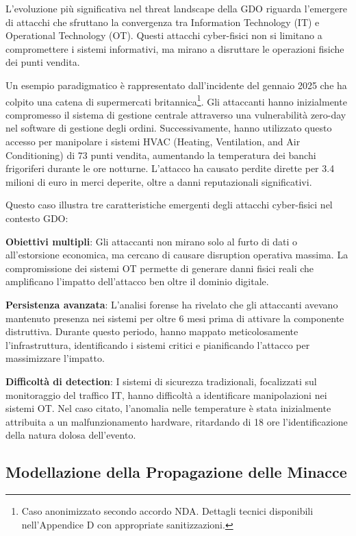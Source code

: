 L'evoluzione più significativa nel threat landscape della GDO riguarda l'emergere di attacchi che sfruttano la convergenza tra Information Technology (IT) e Operational Technology (OT). Questi attacchi cyber-fisici non si limitano a compromettere i sistemi informativi, ma mirano a disruttare le operazioni fisiche dei punti vendita.

Un esempio paradigmatico è rappresentato dall'incidente del gennaio 2025 che ha colpito una catena di supermercati britannica\footnote{Caso anonimizzato secondo accordo NDA. Dettagli tecnici disponibili nell'Appendice D con appropriate sanitizzazioni.}. Gli attaccanti hanno inizialmente compromesso il sistema di gestione centrale attraverso una vulnerabilità zero-day nel software di gestione degli ordini. Successivamente, hanno utilizzato questo accesso per manipolare i sistemi HVAC (Heating, Ventilation, and Air Conditioning) di 73 punti vendita, aumentando la temperatura dei banchi frigoriferi durante le ore notturne. L'attacco ha causato perdite dirette per 3.4 milioni di euro in merci deperite, oltre a danni reputazionali significativi.

Questo caso illustra tre caratteristiche emergenti degli attacchi cyber-fisici nel contesto GDO:

\textbf{Obiettivi multipli}: Gli attaccanti non mirano solo al furto di dati o all'estorsione economica, ma cercano di causare disruption operativa massima. La compromissione dei sistemi OT permette di generare danni fisici reali che amplificano l'impatto dell'attacco ben oltre il dominio digitale.

\textbf{Persistenza avanzata}: L'analisi forense ha rivelato che gli attaccanti avevano mantenuto presenza nei sistemi per oltre 6 mesi prima di attivare la componente distruttiva. Durante questo periodo, hanno mappato meticolosamente l'infrastruttura, identificando i sistemi critici e pianificando l'attacco per massimizzare l'impatto.

\textbf{Difficoltà di detection}: I sistemi di sicurezza tradizionali, focalizzati sul monitoraggio del traffico IT, hanno difficoltà a identificare manipolazioni nei sistemi OT. Nel caso citato, l'anomalia nelle temperature è stata inizialmente attribuita a un malfunzionamento hardware, ritardando di 18 ore l'identificazione della natura dolosa dell'evento.

\subsection{Modellazione della Propagazione delle Minacce}

